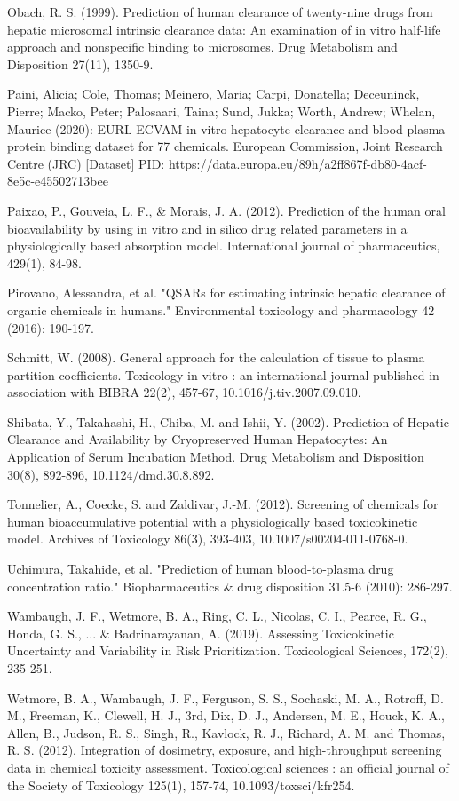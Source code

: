 \documentclass[a4paper]{book}
\begin{document}
\begin{References}
Obach, R. S. (1999). Prediction of human clearance of twenty-nine drugs from
hepatic microsomal intrinsic clearance data: An examination of in vitro
half-life approach and nonspecific binding to microsomes. Drug Metabolism
and Disposition 27(11), 1350-9.

Paini, Alicia; Cole, Thomas; Meinero, Maria; Carpi, Donatella; Deceuninck, 
Pierre; Macko, Peter; Palosaari, Taina; Sund, Jukka; Worth, Andrew; Whelan, 
Maurice (2020):  EURL ECVAM in vitro hepatocyte clearance and blood plasma 
protein binding dataset for 77 chemicals. European Commission, Joint Research 
Centre (JRC) [Dataset] PID: https://data.europa.eu/89h/a2ff867f-db80-4acf-8e5c-e45502713bee

Paixao, P., Gouveia, L. F., \& Morais, J. A. (2012). Prediction of the human
oral bioavailability by using in vitro and in silico drug related parameters
in a physiologically based absorption model. International journal of
pharmaceutics, 429(1), 84-98.

Pirovano, Alessandra, et al. "QSARs for estimating intrinsic hepatic
clearance of organic chemicals in humans." Environmental toxicology and
pharmacology 42 (2016): 190-197.

Schmitt, W. (2008). General approach for the calculation of tissue to plasma
partition coefficients. Toxicology in vitro : an international journal
published in association with BIBRA 22(2), 457-67,
10.1016/j.tiv.2007.09.010.

Shibata, Y., Takahashi, H., Chiba, M. and Ishii, Y. (2002). Prediction of
Hepatic Clearance and Availability by Cryopreserved Human Hepatocytes: An
Application of Serum Incubation Method. Drug Metabolism and Disposition
30(8), 892-896, 10.1124/dmd.30.8.892.

Tonnelier, A., Coecke, S. and Zaldivar, J.-M. (2012). Screening of chemicals
for human bioaccumulative potential with a physiologically based
toxicokinetic model. Archives of Toxicology 86(3), 393-403,
10.1007/s00204-011-0768-0.

Uchimura, Takahide, et al. "Prediction of human blood-to-plasma drug
concentration ratio." Biopharmaceutics \& drug disposition 31.5-6 (2010):
286-297.

Wambaugh, J. F., Wetmore, B. A., Ring, C. L., Nicolas, C. I., Pearce, R. G., 
Honda, G. S., ... \& Badrinarayanan, A. (2019). Assessing Toxicokinetic 
Uncertainty and Variability in Risk Prioritization. Toxicological Sciences, 
172(2), 235-251.

Wetmore, B. A., Wambaugh, J. F., Ferguson, S. S., Sochaski, M. A., Rotroff,
D. M., Freeman, K., Clewell, H. J., 3rd, Dix, D. J., Andersen, M. E., Houck,
K. A., Allen, B., Judson, R. S., Singh, R., Kavlock, R. J., Richard, A. M.
and Thomas, R. S. (2012). Integration of dosimetry, exposure, and
high-throughput screening data in chemical toxicity assessment.
Toxicological sciences : an official journal of the Society of Toxicology
125(1), 157-74, 10.1093/toxsci/kfr254.


\end{References}
\end{document}
